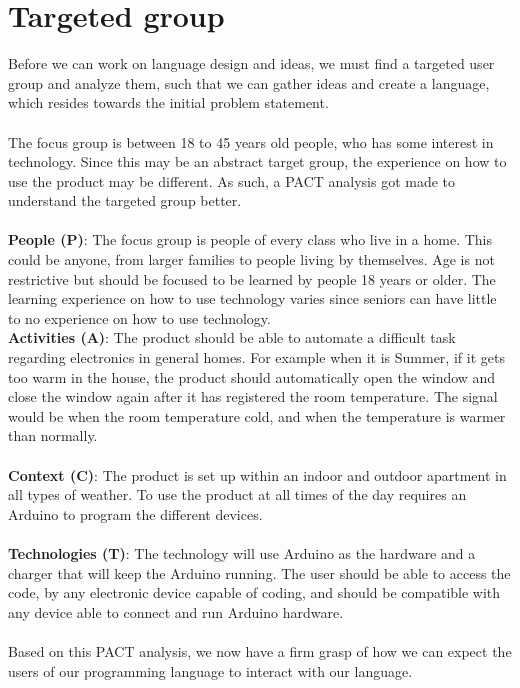\section{Targeted group}
\label{targetedGroup}
Before we can work on language design and ideas, we must find a targeted user group and analyze them, such that we can gather ideas and create a language, which resides towards the initial problem statement. \\
\\
The focus group is between 18 to 45 years old people, who has some interest in technology. Since this may be an abstract target group, the experience on how to use the product may be different. As such, a PACT analysis got made to understand the targeted group better. \\
\\
\textbf{People (P)}: The focus group is people of every class who live in a home. This could be anyone, from larger families to people living by themselves. Age is not restrictive but should be focused to be learned by people 18 years or older. The learning experience on how to use technology varies since seniors can have little to no experience on how to use technology.
\\
\textbf{Activities (A)}: The product should be able to automate a difficult task regarding electronics in general homes. For example when it is Summer, if it gets too warm in the house, the product should automatically open the window and close the window again after it has registered the room temperature. The signal would be when the room temperature cold, and when the temperature is warmer than normally. \\
\\
\textbf{Context (C)}: The product is set up within an indoor and outdoor apartment in all types of weather. To use the product at all times of the day requires an Arduino to program the different devices.\\
\\
\textbf{Technologies (T)}: The technology will use Arduino as the hardware and a charger that will keep the Arduino running. The user should be able to access the code, by any electronic device capable of coding, and should be compatible with any device able to connect and run Arduino hardware. \\
\\
Based on this PACT analysis, we now have a firm grasp of how we can expect the users of our programming language to interact with our language.